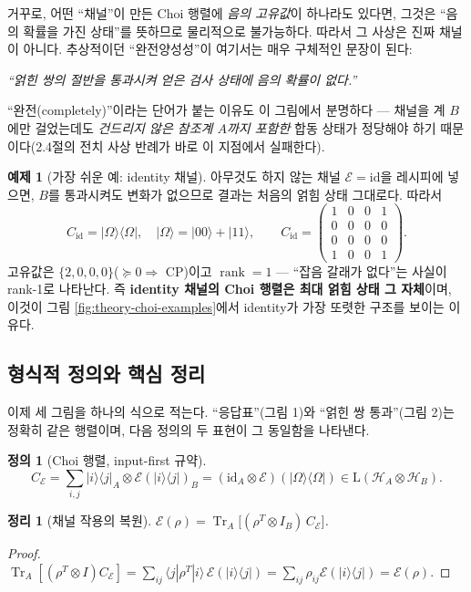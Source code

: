 \documentclass[11pt,a4paper]{article}
\newcommand{\E}{\mathcal{E}}
\newcommand{\Hcal}{\mathcal{H}}
\newcommand{\Tr}{\operatorname{Tr}}
\newcommand{\id}{\mathrm{id}}
\newcommand{\Lin}{\mathrm{L}}
\newcommand{\rank}{\operatorname{rank}}
\theoremstyle{definition}
\newtheorem{definition}{정의}[section]
\newtheorem{example}{예제}[section]
\theoremstyle{plain}
\newtheorem{theorem}{정리}[section]
\theoremstyle{remark}
\begin{document}
거꾸로, 어떤 ``채널''이 만든 Choi 행렬에 \emph{음의 고유값}이 하나라도 있다면, 그것은 ``음의 확률을 가진 상태''를 뜻하므로 물리적으로 불가능하다. 따라서 그 사상은 진짜 채널이 아니다. 추상적이던 ``완전양성성''이 여기서는 매우 구체적인 문장이 된다:
\begin{center}
\emph{``얽힌 쌍의 절반을 통과시켜 얻은 검사 상태에 음의 확률이 없다.''}
\end{center}
``완전(completely)''이라는 단어가 붙는 이유도 이 그림에서 분명하다 --- 채널을 계 $B$에만 걸었는데도 \emph{건드리지 않은 참조계 $A$까지 포함한} 합동 상태가 정당해야 하기 때문이다(2.4절의 전치 사상 반례가 바로 이 지점에서 실패한다).

\begin{example}[가장 쉬운 예: identity 채널]\label{ex:idchoi}
아무것도 하지 않는 채널 $\E=\id$을 레시피에 넣으면, $B$를 통과시켜도 변화가 없으므로 결과는 처음의 얽힘 상태 그대로다. 따라서
\[
C_{\id}=|\Omega\rangle\langle\Omega|,\quad |\Omega\rangle=|00\rangle+|11\rangle,
\qquad
C_{\id}=\begin{pmatrix}1&0&0&1\\0&0&0&0\\0&0&0&0\\1&0&0&1\end{pmatrix}.
\]
고유값은 $\{2,0,0,0\}$($\succeq0\Rightarrow$ CP)이고 $\rank=1$ --- ``잡음 갈래가 없다''는 사실이 rank-1로 나타난다. 즉 \textbf{identity 채널의 Choi 행렬은 최대 얽힘 상태 그 자체}이며, 이것이 그림 \ref{fig:theory-choi-examples}에서 identity가 가장 또렷한 구조를 보이는 이유다.
\end{example}

\subsection{형식적 정의와 핵심 정리}

이제 세 그림을 하나의 식으로 적는다. ``응답표''(그림 1)와 ``얽힌 쌍 통과''(그림 2)는 정확히 같은 행렬이며, 다음 정의의 두 표현이 그 동일함을 나타낸다.

\begin{definition}[Choi 행렬, input-first 규약]
\[
C_\E=\sum_{i,j}|i\rangle\langle j|_A\otimes\E(|i\rangle\langle j|)_B=(\id_A\otimes\E)(|\Omega\rangle\langle\Omega|)\in\Lin(\Hcal_A\otimes\Hcal_B).
\]
\end{definition}

\begin{theorem}[채널 작용의 복원]\label{thm:recover}
$\E(\rho)=\Tr_A\big[(\rho^T\otimes I_B)\,C_\E\big]$.
\end{theorem}
\begin{proof}
$\Tr_A[(\rho^T\otimes I)C_\E]=\sum_{ij}\langle j|\rho^T|i\rangle\,\E(|i\rangle\langle j|)=\sum_{ij}\rho_{ij}\E(|i\rangle\langle j|)=\E(\rho)$.
\end{proof}
\end{document}
